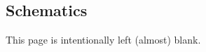 \documentclass[12pt,English,a4paper,twoside,openright]{article}
\begin{document}
\newpage



\newpage
\begin{appendices}

\newpage
\section{Schematics}
  \label{sec:schematics}
  \begin{center}
  \vspace*{\fill}
  This page is intentionally left (almost) blank.
  \vspace*{\fill}
  \end{center}
  
  
  
  

\end{appendices}
\end{document}
